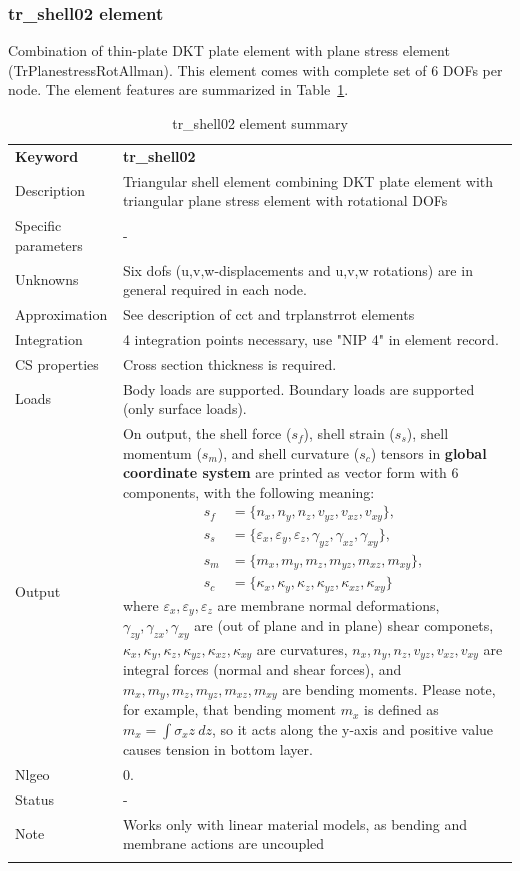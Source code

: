 \documentclass[a4paper]{article}
\newcommand{\param}[1]{\texttt{#1}} %
\newcommand{\templabel}{}%
\newcommand{\tempcaption}{}%
\newcounter{nelpar}
\newenvironment{elementsummary}[5]{%
  \gdef\tempcaption{#4}%
  \gdef\templabel{#5}%
  \setcounter{nelpar}{0}%
  \begin{center} %
    \begin{table}[!htb] %
      \begin{tabular}{|l|p{9cm}|}\hline %
        {\bf Keyword} & \bf{#1}\\ %
        {Description} & {#2}\\ %
        {Specific parameters} & {#3}\\ \hline %
}{
  \\ \hline %
      \end{tabular}%
      \caption{\tempcaption}%
      \label{\templabel}%
    \end{table}%
  \end{center}%
}
\newcommand{\elementParam}[1]{%
  \ifthenelse{\value{nelpar}>0} %
             {&{#1}}%
             {\setcounter{nelpar}{1}Parameters&{#1}}%
             \\%
}
\newcommand{\elementDescription}[2]{{#1} & {#2}\\}
\begin{document}
\subsubsection {tr\_shell02 element}
Combination of thin-plate DKT plate element with plane stress element (TrPlanestressRotAllman). This element comes with complete set of 6 DOFs per node. 
The element features are summarized in Table~\ref{trshell02summary}.

\begin{elementsummary}{tr\_shell02}{Triangular shell element combining DKT plate element with triangular plane stress element with rotational DOFs}{-}{tr\_shell02 element summary}{trshell02summary}
\elementDescription{Unknowns}{Six dofs (u,v,w-displacements and u,v,w rotations) are in general required in each node.}
\elementDescription{Approximation}{See description of cct and trplanstrrot elements}
\elementDescription{Integration}{4 integration points necessary, use "NIP 4" in element record.}
\elementDescription{CS properties}{Cross section thickness is required.}
\elementDescription{Loads}{Body loads are supported. Boundary loads are supported (only surface loads).}
\elementDescription{Output}{On output, the shell force ($s_f$), shell strain ($s_s$), shell momentum ($s_m$), and shell curvature ($s_c$) tensors in \textbf{global coordinate system} are printed as vector form with 6 components, with the following meaning:
\begin{align*}
s_f &= \{n_x, n_y, n_z, v_{yz}, v_{xz}, v_{xy}\},\\
s_s &= \{\varepsilon_x, \varepsilon_y, \varepsilon_z, \gamma_{yz}, \gamma_{xz}, \gamma_{xy}\},\\
s_m &= \{m_x, m_y, m_z, m_{yz}, m_{xz}, m_{xy}\},\\
s_c &= \{\kappa_x, \kappa_y, \kappa_z, \kappa_{yz}, \kappa_{xz}, \kappa_{xy}\}
\end{align*}
where $\varepsilon_x, \varepsilon_y, \varepsilon_z$ are membrane normal deformations, $\gamma_{zy}, \gamma_{zx}, \gamma_{xy}$ are (out of plane and in plane) shear componets, $\kappa_x, \kappa_y, \kappa_z, \kappa_{yz}, \kappa_{xz}, \kappa_{xy}$ are curvatures, $n_x, n_y, n_z, v_{yz}, v_{xz}, v_{xy}$ are integral forces (normal and shear forces), and $m_x, m_y, m_z, m_{yz}, m_{xz}, m_{xy}$ are bending moments. 
Please note, for example, that bending moment $m_x$ is defined as $m_x=\int \sigma_x z\ dz$, so it acts along the y-axis and positive value causes tension in bottom layer.}
\elementDescription{Nlgeo}{0.}
\elementDescription{Status}{-}
\elementDescription{Note}{Works only with linear material models, as bending and membrane actions are uncoupled}
\end{elementsummary}
\end{document}
